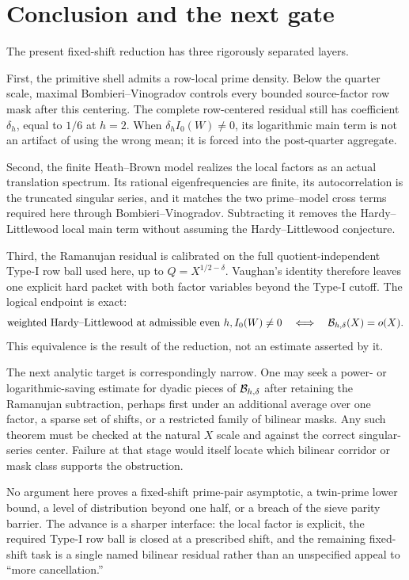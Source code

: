 \section{Conclusion and the next gate}
\label{sec:conclusion}

The present fixed-shift reduction has three rigorously separated layers.

First, the primitive shell admits a row-local prime density.  Below the
quarter scale, maximal Bombieri--Vinogradov controls every bounded
source-factor row mask after this centering.  The complete row-centered residual
still has coefficient $\delta_h$, equal to $1/6$ at $h=2$.  When
$\delta_hI_0(W)\ne0$, its logarithmic main term is not an artifact of using the
wrong mean; it is forced into the post-quarter aggregate.

Second, the finite Heath--Brown model realizes the local factors as an
actual translation spectrum.  Its rational eigenfrequencies are finite,
its autocorrelation is the truncated singular series, and it matches the
two prime--model cross terms required here through
Bombieri--Vinogradov.  Subtracting it removes the Hardy--Littlewood local
main term without assuming the Hardy--Littlewood conjecture.

Third, the Ramanujan residual is calibrated on the full
quotient-independent Type-I row ball used here, up to
$Q=X^{1/2-\delta}$.  Vaughan's identity therefore leaves one explicit
hard packet with both factor variables beyond the Type-I cutoff.  The
logical endpoint is exact:
\[
 \text{weighted Hardy--Littlewood at admissible even }h, I_0(W)\ne0
 \quad\Longleftrightarrow\quad
 \mathcal B_{h,\delta}(X)=o(X).
\]
This equivalence is the result of the reduction, not an estimate asserted
by it.

The next analytic target is correspondingly narrow.  One may seek a
power- or logarithmic-saving estimate for dyadic pieces of
$\mathcal B_{h,\delta}$ after retaining the Ramanujan subtraction, perhaps first
under an additional average over one factor, a sparse set of shifts, or a
restricted family of bilinear masks.  Any such theorem must be checked at
the natural $X$ scale and against the correct singular-series center.
Failure at that stage would itself locate which bilinear corridor or mask
class supports the obstruction.

No argument here proves a fixed-shift prime-pair asymptotic, a twin-prime
lower bound, a level of distribution beyond one half, or a breach of the
sieve parity barrier.  The advance is a sharper interface: the local
factor is explicit, the required Type-I row ball is closed at a prescribed
shift, and the remaining fixed-shift task is a single named bilinear residual
rather than an unspecified appeal to ``more cancellation.''
